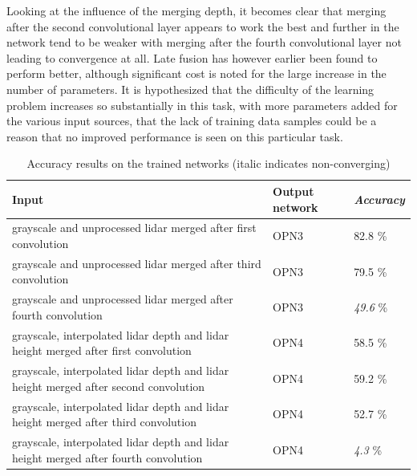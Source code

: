 Looking at the influence of the merging depth, it becomes clear that merging after the second convolutional layer appears to work the best and further in the network tend to be weaker with merging after the fourth convolutional layer not leading to convergence at all. Late fusion has however earlier been found to perform better\cite{schlosser2016}, although significant cost is noted for the large increase in the number of parameters. It is hypothesized that the difficulty of the learning problem increases so substantially in this task, with more parameters added for the various input sources, that the lack of training data samples could be a reason that no improved performance is seen on this particular task. 

\begin{table}[]
\centering
\caption{Accuracy results on the trained networks (italic indicates non-converging)}
\label{tab:merge_results}
\begin{tabular}{|p{7.5cm}|p{2cm}|p{2cm}|}
\hline
\textbf{Input}                                                          & \textbf{Output network} & \textit{\textbf{Accuracy}} \\ \hline
grayscale and unprocessed lidar merged after first convolution          & OPN3                    & 82.8 \%                   \\ \hline
grayscale and unprocessed lidar merged after third convolution          & OPN3                    & 79.5 \%                   \\ \hline
grayscale and unprocessed lidar merged after fourth convolution         & OPN3                    & \textit{49.6} \%          \\ \hline
grayscale, interpolated lidar depth and lidar height merged after first convolution          & OPN4                    & 58.5 \%                   \\ \hline
grayscale, interpolated lidar depth and lidar height merged after second convolution         & OPN4                    & 59.2 \%                   \\ \hline
grayscale, interpolated lidar depth and lidar height merged after third convolution          & OPN4                    & 52.7 \%                   \\ \hline
grayscale, interpolated lidar depth and lidar height merged after fourth convolution         & OPN4                    & \textit{4.3} \%                   \\ \hline
\end{tabular}
\end{table}

